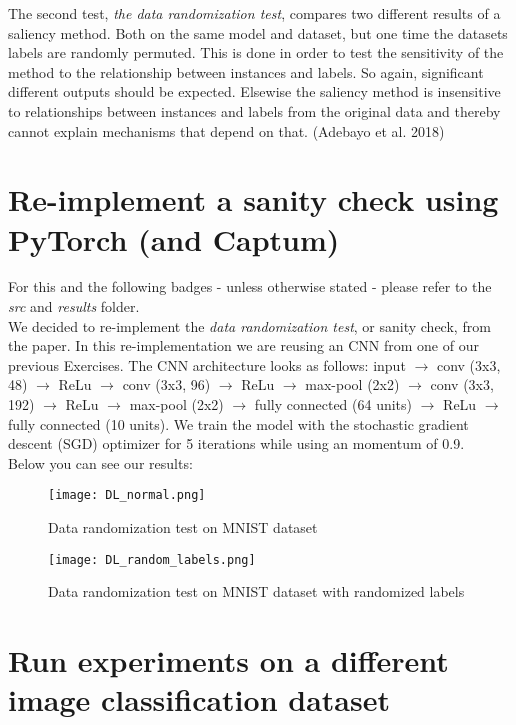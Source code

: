 \documentclass{article}
\begin{document}
The second test, \textit{the data randomization test}, compares two different results of a saliency method. Both on the same model and dataset, but one time the datasets labels are randomly permuted. This is done in order to test the sensitivity of the method to the relationship between instances and labels. So again, significant different outputs should be expected. Elsewise the saliency method is insensitive to relationships between instances and labels from the original data and thereby cannot explain mechanisms that depend on that. (Adebayo et al. 2018) \par

\section{Re-implement a sanity check using PyTorch (and Captum)}
For this and the following badges - unless otherwise stated - please refer to the \textit{src} and \textit{results} folder.\\

We decided to re-implement the \textit{data randomization test}, or sanity check, from the paper. In this re-implementation we are reusing an CNN from one of our previous Exercises. The CNN architecture looks as follows: input $\to$ conv (3x3, 48) $\to$ ReLu $\to$ conv (3x3, 96) $\to$ ReLu $\to$ max-pool (2x2) $\to$ conv (3x3, 192) $\to$ ReLu $\to$ max-pool (2x2) $\to$ fully connected (64 units) $\to$ ReLu $\to$ fully connected (10 units). We train the model with the stochastic gradient descent (SGD) optimizer for 5 iterations while using an momentum of 0.9. \\

Below you can see our results:
\begin{figure}[h!]
\centering
\texttt{[image: DL\_normal.png]}
\caption{Data randomization test on MNIST dataset}
\label{fig:mnist_normal}
\end{figure}

\begin{figure}[h!]
\centering
\texttt{[image: DL\_random\_labels.png]}
\caption{Data randomization test on MNIST dataset with randomized labels}
\label{fig:mnist_random_labels}
\end{figure}

\section{Run experiments on a different image classification dataset}
\end{document}
